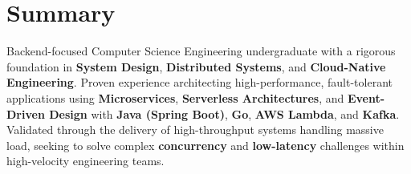 \MainDivider
\section*{Summary}
\BigDivider
\noindent
Backend-focused Computer Science Engineering undergraduate with a rigorous foundation in \textbf{System Design}, \textbf{Distributed Systems}, and \textbf{Cloud-Native Engineering}. Proven experience architecting high-performance, fault-tolerant applications using \textbf{Microservices}, \textbf{Serverless Architectures}, and \textbf{Event-Driven Design} with \textbf{Java (Spring Boot)}, \textbf{Go}, \textbf{AWS Lambda}, and \textbf{Kafka}. Validated through the delivery of high-throughput systems handling massive load, seeking to solve complex \textbf{concurrency} and \textbf{low-latency} challenges within high-velocity engineering teams.







